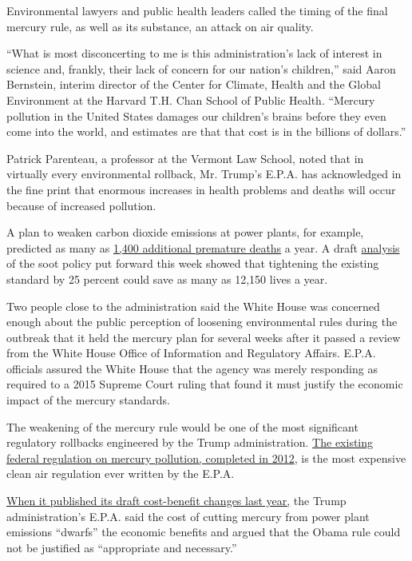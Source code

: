 Environmental lawyers and public health leaders called the timing of the
final mercury rule, as well as its substance, an attack on air quality.

``What is most disconcerting to me is this administration's lack of
interest in science and, frankly, their lack of concern for our nation's
children,'' said Aaron Bernstein, interim director of the Center for
Climate, Health and the Global Environment at the Harvard T.H. Chan
School of Public Health. ``Mercury pollution in the United States
damages our children's brains before they even come into the world, and
estimates are that that cost is in the billions of dollars.''

Patrick Parenteau, a professor at the Vermont Law School, noted that in
virtually every environmental rollback, Mr. Trump's E.P.A. has
acknowledged in the fine print that enormous increases in health
problems and deaths will occur because of increased pollution.

A plan to weaken carbon dioxide emissions at power plants, for example,
predicted as many as
\href{https://www.nytimes3xbfgragh.onion/2018/08/21/climate/epa-coal-pollution-deaths.html}{1,400
additional premature deaths} a year. A draft
\href{https://www.epa.gov/sites/production/files/2019-09/documents/draft_policy_assessment_for_pm_naaqs_09-05-2019.pdf}{analysis}
of the soot policy put forward this week showed that tightening the
existing standard by 25 percent could save as many as 12,150 lives a
year.

Two people close to the administration said the White House was
concerned enough about the public perception of loosening environmental
rules during the outbreak that it held the mercury plan for several
weeks after it passed a review from the White House Office of
Information and Regulatory Affairs. E.P.A. officials assured the White
House that the agency was merely responding as required to a 2015
Supreme Court ruling that found it must justify the economic impact of
the mercury standards.

The weakening of the mercury rule would be one of the most significant
regulatory rollbacks engineered by the Trump administration.
\href{https://www.nytimes3xbfgragh.onion/2011/03/17/science/earth/17epa.html}{The
existing federal regulation on mercury pollution, completed in 2012}, is
the most expensive clean air regulation ever written by the E.P.A.

\href{https://www.nytimes3xbfgragh.onion/2018/12/28/climate/mercury-coal-pollution-regulations.html}{When
it published its draft cost-benefit changes last year,} the Trump
administration's E.P.A. said the cost of cutting mercury from power
plant emissions ``dwarfs'' the economic benefits and argued that the
Obama rule could not be justified as ``appropriate and necessary.''

